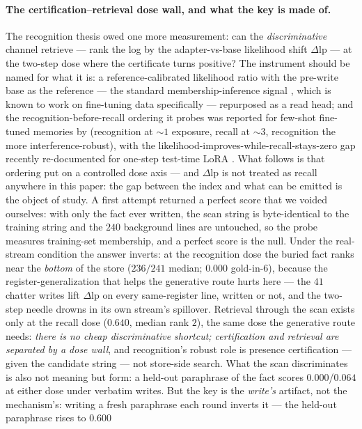 \documentclass[11pt]{article}
\newcommand{\dlp}{\Delta\mathrm{lp}}
\begin{document}
\paragraph{The certification--retrieval dose wall, and what the key is made of.} The
recognition thesis owed one more measurement: can the \emph{discriminative} channel
retrieve --- rank the log by the adapter-vs-base likelihood shift $\dlp$ --- at the
two-step dose where the certificate turns positive? The instrument should be named for
what it is: a reference-calibrated likelihood ratio with the pre-write base as the
reference --- the standard membership-inference signal \citep{carlini2022lira}, which is
known to work on fine-tuning data specifically \citep{duan2024mia} --- repurposed as a
read head; and the recognition-before-recall ordering it probes was reported for few-shot
fine-tuned memories by \citet{orhan2023recognition} (recognition at ${\sim}1$ exposure,
recall at ${\sim}3$, recognition the more interference-robust), with the
likelihood-improves-while-recall-stays-zero gap recently re-documented for one-step
test-time LoRA \citep{song2026beyondppl}. What follows is that ordering put on a
controlled dose axis --- and $\dlp$ is not treated as recall anywhere in this paper: the
gap between the index and what can be emitted is the object of study. A first attempt returned a perfect
score that we voided ourselves: with only the fact ever written, the scan string is
byte-identical to the training string and the $240$ background lines are untouched, so the
probe measures training-set membership, and a perfect score is the null. Under the
real-stream condition the answer inverts: at the recognition dose the buried fact ranks
near the \emph{bottom} of the store ($236/241$ median; $0.000$ gold-in-6), because the
register-generalization that helps the generative route hurts here --- the $41$ chatter
writes lift $\dlp$ on every same-register line, written or not, and the two-step needle
drowns in its own stream's spillover. Retrieval through the scan exists only at the recall
dose ($0.640$, median rank $2$), the same dose the generative route needs: \emph{there is
no cheap discriminative shortcut; certification and retrieval are separated by a dose
wall}, and recognition's robust role is presence certification --- given the candidate
string --- not store-side search. What the scan discriminates is also not meaning but
form: a held-out paraphrase of the fact scores $0.000$/$0.064$ at either dose under
verbatim writes. But the key is the \emph{write's} artifact, not the mechanism's: writing
a fresh paraphrase each round inverts it --- the held-out paraphrase rises to $0.600$
\end{document}
